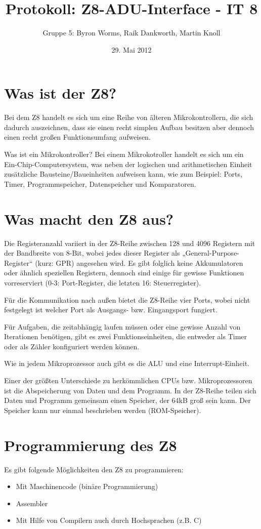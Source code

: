 \documentclass[a4paper,11pt]{article}
\title{Protokoll: Z8-ADU-Interface - IT 8}
\author{Gruppe 5: Byron Worms, Raik Dankworth, Martin Knoll}
\date{29. Mai 2012}
\begin{document}
\begin{titlepage}
\maketitle
\end{titlepage}

\section{Was ist der Z8?}
Bei dem Z8 handelt es sich um eine Reihe von älteren Mikrokontrollern, die sich dadurch auszeichnen, dass sie einen recht simplen Aufbau besitzen aber dennoch einen recht großen Funktionsumfang aufweisen. 

Was ist ein Mikrokontroller?
 Bei einem Mikrokotroller handelt es sich um ein Ein-Chip-Computersystem, was neben der logischen und arithmetischen Einheit zusätzliche Bausteine/Baueinheiten aufweisen kann, wie zum Beispiel: Ports, Timer, Programmspeicher, Datenspeicher und Komparatoren.

\section{Was macht den Z8 aus?}
Die Registeranzahl variiert in der Z8-Reihe zwischen 128 und 4096 Registern mit der Bandbreite von 8-Bit, wobei  jedes dieser Register als „General-Purpose-Register“ (kurz: GPR) angesehen wird. Es gibt folglich keine Akkumulatoren oder ähnlich speziellen Registern, dennoch sind einige für gewisse Funktionen vorreserviert (0-3: Port-Register, die letzten 16: Steuerregister). 

Für die Kommunikation nach außen bietet die Z8-Reihe vier Ports, wobei nicht festgelegt ist welcher Port als Ausgangs- bzw. Eingangsport fungiert. 

Für Aufgaben, die zeitabhängig laufen müssen oder eine gewisse Anzahl von Iterationen benötigen, gibt es zwei Funktionseinheiten, die entweder als Timer oder als Zähler konfiguriert werden können. 

Wie in jedem Mikroprozessor auch gibt es die ALU und eine Interrupt-Einheit. 

Einer der größten Unterschiede zu herkömmlichen CPUs bzw. Mikroprozessoren ist die Abspeicherung von Daten und dem Programm. 
In der Z8-Reihe teilen sich Daten und Programm gemeinsam einen Speicher, der 64kB groß sein kann. 
Der Speicher kann nur einmal beschrieben werden (ROM-Speicher). 

\section{Programmierung des Z8}
Es gibt folgende Möglichkeiten den Z8 zu programmieren:
\begin{itemize}
  \item Mit Maschinencode (binäre Programmierung)
  \item Assembler
  \item Mit Hilfe von Compilern auch durch Hochsprachen (z.B. C)
\end{itemize}
\end{document}
